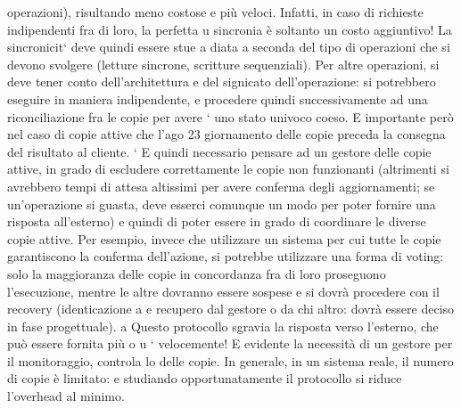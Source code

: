 \documentclass[a4paper,12pt]{article}
\begin{document}
operazioni), risultando meno costose
e più veloci. Infatti, in caso di richieste indipendenti fra di loro, la perfetta
u
sincronia è soltanto un costo aggiuntivo! La sincronicit` deve quindi essere stue
a
diata a seconda del tipo di operazioni che si devono svolgere (letture sincrone,
scritture sequenziali). Per altre operazioni, si deve tener conto dell'architettura
e del signicato dell'operazione: si potrebbero eseguire in maniera indipendente,
e procedere quindi successivamente ad una riconciliazione fra le copie per avere
`
uno stato univoco coeso. E importante però nel caso di copie attive che l'ago
23
giornamento delle copie preceda la consegna del risultato al cliente.
`
E quindi necessario pensare ad un gestore delle copie attive, in grado di escludere correttamente le copie non
funzionanti (altrimenti si avrebbero tempi
di attesa altissimi per avere conferma degli aggiornamenti; se un'operazione si
guasta, deve esserci comunque un modo per poter fornire una risposta all'esterno) e quindi di poter essere in grado di
coordinare le diverse copie attive. Per
esempio, invece che utilizzare un sistema per cui tutte le copie garantiscono la
conferma dell'azione, si potrebbe utilizzare una forma di voting: solo la maggioranza delle copie in concordanza fra di
loro proseguono l'esecuzione, mentre le
altre dovranno essere sospese e si dovrà procedere con il recovery (identicazione
a
e recupero dal gestore o da chi altro: dovrà essere deciso in fase progettuale).
a
Questo protocollo sgravia la risposta verso l'esterno, che può essere fornita più
o
u
`
velocemente! E evidente la necessità di un gestore per il monitoraggio, controla
lo delle copie. In generale, in un sistema reale, il numero di copie è limitato:
e
studiando opportunatamente il protocollo si riduce l'overhead al minimo.
\end{document}
